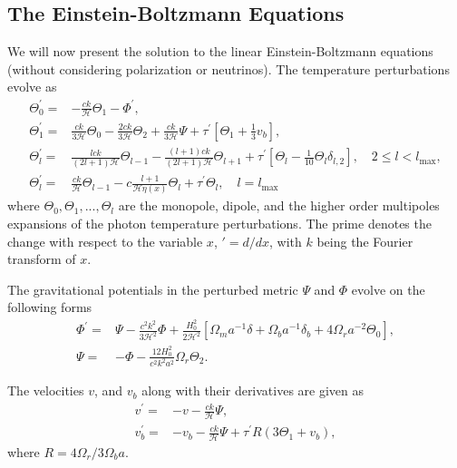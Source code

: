 \documentclass[a4paper, 10pt, reqno]{amsart}
\begin{document}
\subsection{The Einstein-Boltzmann Equations}
We will now present the solution to the linear Einstein-Boltzmann equations (without considering polarization or neutrinos). The temperature perturbations evolve as
\begin{align}
    \Theta_{0}^{\prime}= & -\frac{c k}{\mathcal{H}} \Theta_{1}-\Phi^{\prime},\label{eq: monopole'}\\
    \Theta_{1}^{\prime}= & \frac{c k}{3 \mathcal{H}} \Theta_{0}-\frac{2 c k}{3 \mathcal{H}} \Theta_{2}+\frac{c k}{3 \mathcal{H}} \Psi+\tau^{\prime}\left[\Theta_{1}+\frac{1}{3} v_{b}\right],\label{eq: dipole'}\\
    \Theta_{l}^{\prime}= & \frac{l c k}{(2 l+1) \mathcal{H}} \Theta_{l-1}-\frac{(l+1) c k}{(2 l+1) \mathcal{H}} \Theta_{l+1}+\tau^{\prime}\left[\Theta_{l}-\frac{1}{10} \Theta_{l} \delta_{l, 2}\right], \quad 2 \leq l<l_{\max }, \label{eq: multipole'}\\
    \Theta_{l}^{\prime}= & \frac{c k}{\mathcal{H}} \Theta_{l-1}-c \frac{l+1}{\mathcal{H} \eta(x)} \Theta_{l}+\tau^{\prime} \Theta_{l}, \quad l=l_{\max }\label{eq: multipole' final}
\end{align}
where $\Theta_0, \Theta_1, ... ,\Theta_l$ are the monopole, dipole, and the higher order multipoles expansions of the photon temperature perturbations. The prime denotes the change with respect to the variable $x$,  $\prime = d/dx$, with $k$ being the Fourier transform of $x$. 

The gravitational potentials in the perturbed metric $\Psi$ and $\Phi$ evolve on the following forms
\begin{align}
   \Phi^{\prime} = & \Psi-\frac{c^{2} k^{2}}{3 \mathcal{H}^{2}} \Phi+\frac{H_{0}^{2}}{2 \mathcal{H}^{2}}\left[\Omega_{m} a^{-1} \delta+\Omega_{b} a^{-1} \delta_{b}+4 \Omega_{r} a^{-2} \Theta_{0}\right], \label{eq: Phi'} \\ 
   \Psi = &-\Phi-\frac{12 H_{0}^{2}}{c^{2} k^{2} a^{2}} \Omega_{r} \Theta_{2}. \label{eq: Psi'}
\end{align}

The velocities $v$, and $v_b$ along with their derivatives are given as
\begin{align}
    v^{\prime}= & -v-\frac{c k}{\mathcal{H}} \Psi, \label{eq: v'}\\
    v_{b}^{\prime}= & -v_{b}-\frac{c k}{\mathcal{H}} \Psi+\tau^{\prime} R\left(3 \Theta_{1}+v_{b}\right) , \label{eq: v_b'}
\end{align}
where $ R = 4\Omega_r/3\Omega_b a$.
\end{document}
